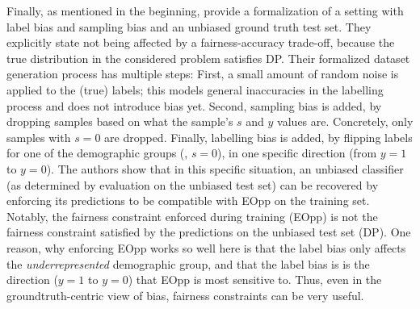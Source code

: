 Finally, as mentioned in the beginning,
\citet{blum2020recovering} provide a formalization of a setting with label bias and sampling bias
and an unbiased ground truth test set.
They explicitly state not being affected by a fairness-accuracy trade-off,
because the true distribution in the considered problem satisfies \acf{DP}.
Their formalized dataset generation process has multiple steps:
First, a small amount of random noise is applied to the (true) labels;
this models general inaccuracies in the labelling process and does not introduce bias yet.
Second, sampling bias is added, by dropping samples based on what the sample's \(s\) and \(y\) values are.
Concretely, only samples with \(s=0\) are dropped.
Finally, labelling bias is added, by flipping labels for one of the demographic groups (\eg, \(s=0\)),
in one specific direction (from \(y=1\) to \(y=0\)).
The authors show that in this specific situation,
an unbiased classifier (as determined by evaluation on the unbiased test set) can be recovered
by enforcing its predictions to be compatible with \acf{EOpp} on the training set.
Notably, the fairness constraint enforced during training (\ac{EOpp})
is not the fairness constraint satisfied by the predictions on the unbiased test set (\ac{DP}).
One reason, why enforcing \ac{EOpp} works so well here is
that the label bias only affects the \emph{underrepresented} demographic group,
and that the label bias is is the direction (\(y=1\) to \(y=0\)) that \ac{EOpp} is most sensitive to.
Thus, even in the groundtruth-centric view of bias,
fairness constraints can be very useful.



